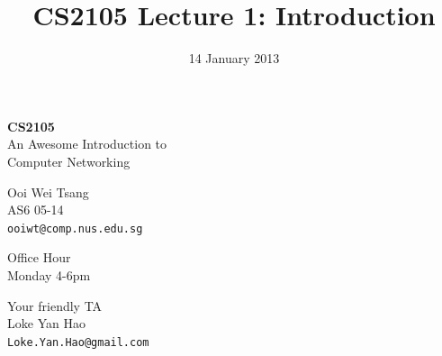 \documentclass[20pt,handout,notes=show]{beamer}
\begin{document}
\title{CS2105 Lecture 1: Introduction}
\date{14 January 2013} 


\begin{frame}
\begin{center}
\textbf{
\Huge
CS2105\\[10pt]
	}
\large
An Awesome Introduction to\\ Computer Networking
\end{center}
\end{frame}


\begin{frame}
\begin{center}
\large
Ooi Wei Tsang\\
AS6 05-14\\
\large
\texttt{ooiwt@comp.nus.edu.sg}\\
\end{center}
\end{frame}

\begin{frame}
\begin{center}
\large
Office Hour\\
\large
Monday 4-6pm
\end{center}
\end{frame}

\begin{frame}
\begin{center}
\large
Your friendly TA\\
\large
Loke Yan Hao\\
\large
\texttt{Loke.Yan.Hao@gmail.com}\\
\end{center}
\end{frame}
\end{document}
